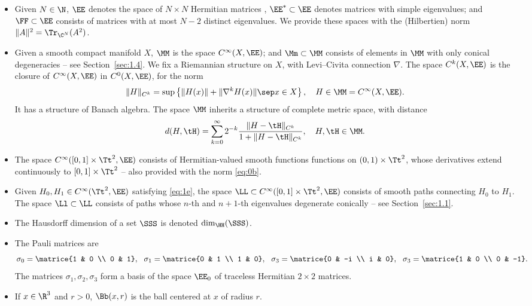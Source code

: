 \label{sec:1.6}
\begin{itemize}
\item Given $N \in \N$, $\EE$ denotes the space of $N \times N$ Hermitian matrices , $\EE^* \subset \EE$ denotes matrices with simple eigenvalues; and $\FF \subset \EE$ consists of matrices with at most $N-2$ distinct eigenvalues. We provide these spaces with the (Hilbertien) norm $\|A\|^2 = \Tr_{\C^N}(A^2)$.
\item Given a smooth compact manifold $X$, $\MM$ is the space $C^\infty(X,\EE)$; and $\Mm \subset \MM$ consists of elements in $\MM$ with only conical degeneracies -- see Section~\ref{sec:1.4}. We fix a Riemannian structure on $X$, with Levi--Civita connection $\nabla$. The space $C^k(X,\EE)$ is the closure of $C^\infty(X,\EE)$ in $C^0(X,\EE)$, for the norm
\begin{equation*}
\| H \|_{C^k} = \sup \left\{\| H(x)\| +\| \nabla^k H(x)\|\sep x \in X \right\}, \quad H \in \MM = C^\infty(X,\EE).
\end{equation*}
It has a structure of Banach algebra. The space $\MM$ inherits a structure of complete metric space, with distance
\begin{equation}\label{eq:0b}
d(H,\tH) = \sum_{k=0}^\infty 2^{-k} \dfrac{\| H-\tH \|_{C^k}}{1+\| H-\tH \|_{C^k}}, \quad H, \tH \in \MM.
\end{equation}
\item The space $C^\infty([0,1] \times \Tt^2,\EE)$ consists of Hermitian-valued smooth functions functions on $(0,1) \times \Tt^2$, whose derivatives extend continuously to $[0,1] \times \Tt^2$ -- also provided with the norm \eqref{eq:0b}.
\item Given $H_0, H_1 \in C^\infty(\Tt^2, \EE)$ satisfying \eqref{eq:1e}, the space $\LL \subset C^\infty([0,1] \times \Tt^2,\EE)$ consists of smooth paths connecting $H_0$ to $H_1$. The space $\Ll \subset \LL$ consists of paths whose $n$-th and $n+1$-th eigenvalues degenerate conically -- see Section~\ref{sec:1.1}.
\item The Hausdorff dimension of a set $\SSS$ is denoted $\dim_\HH(\SSS)$.
\item The Pauli matrices are
\begin{equation*}
\sigma_0 = \matrice{1 & 0 \\ 0 & 1}, \ \ \sigma_1 = \matrice{0 & 1 \\ 1 & 0}, \ \ \sigma_3 = \matrice{0 & -i \\ i & 0}, \ \ \sigma_3 = \matrice{1 & 0 \\ 0 & -1}.
\end{equation*}
The matrices $\sigma_1, \sigma_2, \sigma_3$ form a basis of the space $\EE_0$ of traceless Hermitian $2 \times 2$ matrices.
\item If $x \in \R^3$ and $r > 0$, $\Bb(x,r)$ is the ball centered at $x$ of radius $r$.
\end{itemize}

